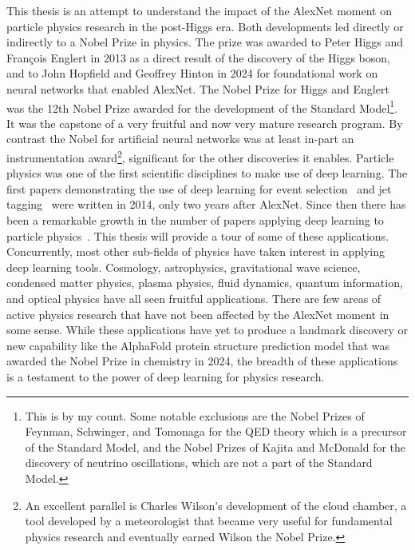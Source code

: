This thesis is an attempt to understand the impact of the AlexNet moment on particle physics research in the post-Higgs era.
Both developments led directly or indirectly to a Nobel Prize in physics.
The prize was awarded to Peter Higgs and François Englert in 2013 as a direct result of the discovery of the Higgs boson, and to John Hopfield and Geoffrey Hinton in 2024 for foundational work on neural networks that enabled AlexNet.
The Nobel Prize for Higgs and Englert was the 12th Nobel Prize awarded for the development of the Standard Model\footnote{This is by my count. Some notable exclusions are the Nobel Prizes of Feynman, Schwinger, and Tomonaga for the QED theory which is a precursor of the Standard Model, and the Nobel Prizes of Kajita and McDonald for the discovery of neutrino oscillations, which are not a part of the Standard Model.}.
It was the capstone of a very fruitful and now very mature research program.
By contrast the Nobel for artificial neural networks was at least in-part an instrumentation award\footnote{An excellent parallel is Charles Wilson's development of the cloud chamber, a tool developed by a meteorologist that became very useful for fundamental physics research and eventually earned Wilson the Nobel Prize.}, significant for the other discoveries it enables.
Particle physics was one of the first scientific disciplines to make use of deep learning.
The first papers demonstrating the use of deep learning for event selection~\cite{Baldi:2014kfa} and jet tagging~\cite{Cogan:2014oua} were written in 2014, only two years after AlexNet.
Since then there has been a remarkable growth in the number of papers applying deep learning to particle physics~\cite{hepmllivingreview}.
This thesis will provide a tour of some of these applications.
Concurrently, most other sub-fields of physics have taken interest in applying deep learning tools.
Cosmology, astrophysics, gravitational wave science, condensed matter physics, plasma physics, fluid dynamics, quantum information, and optical physics have all seen fruitful applications.
There are few areas of active physics research that have not been affected by the AlexNet moment in some sense.
While these applications have yet to produce a landmark discovery or new capability like the AlphaFold protein structure prediction model that was awarded the Nobel Prize in chemistry in 2024, the breadth of these applications is a testament to the power of deep learning for physics research.

